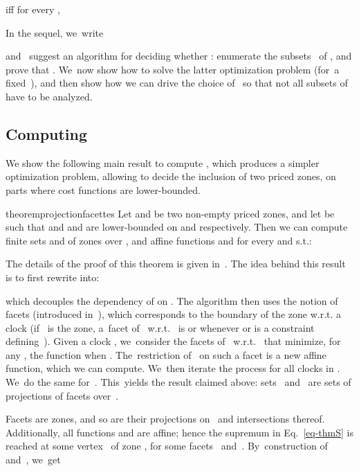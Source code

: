 \begin{corollary}
  \label{coro:decompos}
   iff for every , 
\end{corollary}

In the sequel, we~write 

 and~ suggest an
algorithm for deciding whether : enumerate
the subsets~ of , and prove that . 
We~now show how to solve the latter optimization problem (for~a
fixed~), and then show how we can drive the choice of~ so that
not all subsets of~ have to be analyzed.

\subsection{Computing }

We show the following main result to compute ,
which produces a simpler optimization problem, allowing to decide the
inclusion of two priced zones, on parts where cost functions are
lower-bounded.

\begin{restatable}{theorem}{projectionfacettes}
  \label{theo:projections-facets}
  Let  and  be two
  non-empty priced zones, and let  be such that
   and  and  are
  lower-bounded on  and  respectively.
  Then we can compute finite sets  and 
  of zones over , and affine functions  and 
  for every  and  s.t.:
  
\end{restatable}

The details of the proof of this theorem is given in~.
The idea behind this result is to first rewrite 
into:

which decouples the dependency of  on .
The algorithm then uses the notion of facets (introduced
in~\cite{LBB+01}), which corresponds to the boundary of the zone
w.r.t. a clock (if~ is the zone, a~facet of~ w.r.t.~ is
 or  whenever  or  is a constraint defining~). Given a
clock , we~consider the facets of~
w.r.t.~ that minimize, for any ,
the function  when .
The~restriction of~ on such a facet is a new affine function,
which we can compute. We~then iterate the process for all clocks in . We~do the same for~. This~yields the result
claimed above: sets~ and~ are sets of
projections of facets over~.

Facets are zones, and so are their projections on~ and
intersections thereof. Additionally, all functions  and
 are affine; hence the supremum in Eq.~\eqref{eq-thmS} is
reached at some vertex~ of zone , for some facets~
and~.
By~construction of~ and~, we~get



